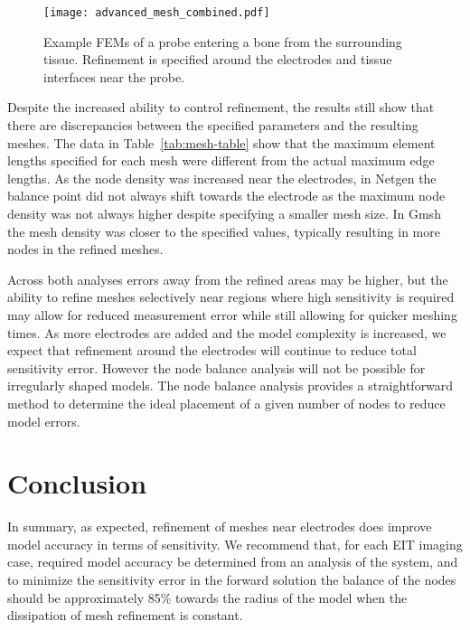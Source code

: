 \documentclass[12pt]{iopart}
\begin{document}
\begin{figure}
  \texttt{[image: advanced\_mesh\_combined.pdf]}
    \caption{\label{fig:adv_mesh} Example FEMs of a probe entering a bone from the surrounding 
    tissue. Refinement is specified around the electrodes and tissue interfaces near the probe.}
\end{figure}

Despite the increased ability to control refinement, the results still show that there are
discrepancies between the specified parameters and the resulting meshes. The data in 
Table~\ref{tab:mesh-table} show that the maximum element lengths specified for each mesh 
were different from the actual maximum edge lengths. As the node density was increased
near the electrodes, in Netgen the balance point did not always shift towards the electrode
as the maximum node density was not always higher despite specifying a smaller mesh size.
In Gmsh the mesh density was closer to the specified values, typically resulting in more
nodes in the refined meshes. 

Across both analyses errors away from the refined areas may be higher,
but the ability to refine meshes selectively near regions where high sensitivity 
is required may allow for reduced measurement error while still allowing for quicker 
meshing times.
As more electrodes are added and the model complexity is increased, we expect that 
refinement around the electrodes will continue to reduce total sensitivity error. However 
the node balance analysis will not be possible for irregularly shaped models.
The node balance analysis provides a straightforward method to determine the 
ideal placement of a given number of nodes to reduce model errors.



\section{Conclusion}

In summary, as expected, refinement of  meshes near electrodes 
does improve model accuracy in terms of sensitivity.
We recommend that, for each EIT imaging case, required model accuracy be
determined from an analysis of the system, 
and to minimize the sensitivity error in the forward solution 
the balance of the nodes should be approximately 
85\% towards the radius of the
model when the dissipation of mesh refinement is constant. 

\printbibliography
\end{document}
